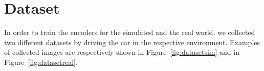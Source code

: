 %


%

\section{Dataset}
In order to train the encoders for the simulated and the real world, we collected two different datasets by driving the car in the respective environment. Examples of collected images are respectively shown in Figure~\ref{fig:datasetsim} and in Figure~\ref{fig:datasetreal}.

